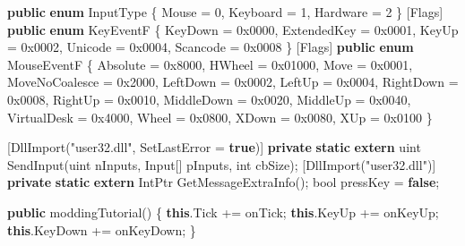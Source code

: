 \documentclass[
  openany]{book}
\newenvironment{Shaded}{\begin{snugshade}}{\end{snugshade}}
\newcommand{\BaseNTok}[1]{\textcolor[rgb]{0.00,0.00,0.81}{#1}}
\newcommand{\DataTypeTok}[1]{\textcolor[rgb]{0.13,0.29,0.53}{#1}}
\newcommand{\DecValTok}[1]{\textcolor[rgb]{0.00,0.00,0.81}{#1}}
\newcommand{\FunctionTok}[1]{\textcolor[rgb]{0.00,0.00,0.00}{#1}}
\newcommand{\KeywordTok}[1]{\textcolor[rgb]{0.13,0.29,0.53}{\textbf{#1}}}
\newcommand{\NormalTok}[1]{#1}
\newcommand{\StringTok}[1]{\textcolor[rgb]{0.31,0.60,0.02}{#1}}
\begin{document}
\begin{Shaded}
\begin{Highlighting}[]
\NormalTok{        [Flags]}
        \KeywordTok{public} \KeywordTok{enum}\NormalTok{ InputType}
\NormalTok{        \{}
\NormalTok{            Mouse = }\DecValTok{0}\NormalTok{,}
\NormalTok{            Keyboard = }\DecValTok{1}\NormalTok{,}
\NormalTok{            Hardware = }\DecValTok{2}
\NormalTok{        \}}
\NormalTok{        [Flags]}
        \KeywordTok{public} \KeywordTok{enum}\NormalTok{ KeyEventF}
\NormalTok{        \{}
\NormalTok{            KeyDown = }\BaseNTok{0x0000}\NormalTok{,}
\NormalTok{            ExtendedKey = }\BaseNTok{0x0001}\NormalTok{,}
\NormalTok{            KeyUp = }\BaseNTok{0x0002}\NormalTok{,}
\NormalTok{            Unicode = }\BaseNTok{0x0004}\NormalTok{,}
\NormalTok{            Scancode = }\BaseNTok{0x0008}
\NormalTok{        \}}
\NormalTok{        [Flags]}
        \KeywordTok{public} \KeywordTok{enum}\NormalTok{ MouseEventF}
\NormalTok{        \{}
\NormalTok{            Absolute = }\BaseNTok{0x8000}\NormalTok{,}
\NormalTok{            HWheel = }\BaseNTok{0x01000}\NormalTok{,}
\NormalTok{            Move = }\BaseNTok{0x0001}\NormalTok{,}
\NormalTok{            MoveNoCoalesce = }\BaseNTok{0x2000}\NormalTok{,}
\NormalTok{            LeftDown = }\BaseNTok{0x0002}\NormalTok{,}
\NormalTok{            LeftUp = }\BaseNTok{0x0004}\NormalTok{,}
\NormalTok{            RightDown = }\BaseNTok{0x0008}\NormalTok{,}
\NormalTok{            RightUp = }\BaseNTok{0x0010}\NormalTok{,}
\NormalTok{            MiddleDown = }\BaseNTok{0x0020}\NormalTok{,}
\NormalTok{            MiddleUp = }\BaseNTok{0x0040}\NormalTok{,}
\NormalTok{            VirtualDesk = }\BaseNTok{0x4000}\NormalTok{,}
\NormalTok{            Wheel = }\BaseNTok{0x0800}\NormalTok{,}
\NormalTok{            XDown = }\BaseNTok{0x0080}\NormalTok{,}
\NormalTok{            XUp = }\BaseNTok{0x0100}
\NormalTok{        \}}

\NormalTok{        [}\FunctionTok{DllImport}\NormalTok{(}\StringTok{"user32.dll"}\NormalTok{, SetLastError = }\KeywordTok{true}\NormalTok{)]}
        \KeywordTok{private} \KeywordTok{static} \KeywordTok{extern} \DataTypeTok{uint} \FunctionTok{SendInput}\NormalTok{(}\DataTypeTok{uint}\NormalTok{ nInputs, Input[] pInputs, }\DataTypeTok{int}\NormalTok{ cbSize);}
\NormalTok{        [}\FunctionTok{DllImport}\NormalTok{(}\StringTok{"user32.dll"}\NormalTok{)]}
        \KeywordTok{private} \KeywordTok{static} \KeywordTok{extern}\NormalTok{ IntPtr }\FunctionTok{GetMessageExtraInfo}\NormalTok{();}
        \DataTypeTok{bool}\NormalTok{ pressKey = }\KeywordTok{false}\NormalTok{;}

  
        \KeywordTok{public} \FunctionTok{moddingTutorial}\NormalTok{()}
\NormalTok{        \{}
            \KeywordTok{this}\NormalTok{.}\FunctionTok{Tick}\NormalTok{ += onTick;}
            \KeywordTok{this}\NormalTok{.}\FunctionTok{KeyUp}\NormalTok{ += onKeyUp;}
            \KeywordTok{this}\NormalTok{.}\FunctionTok{KeyDown}\NormalTok{ += onKeyDown;}
\NormalTok{        \}}


\end{Highlighting}
\end{Shaded}
\end{document}
